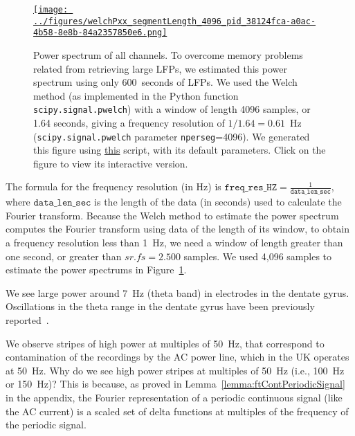 \documentclass[12pt]{article}
\begin{document}
\begin{figure}[H]
    \begin{center}
        \href{https://www.gatsby.ucl.ac.uk/~rapela/neuroinformatics/2023/ws3/figures/welchPxx_segmentLength_4096_pid_38124fca-a0ac-4b58-8e8b-84a2357850e6.html}{\texttt{[image: ../figures/welchPxx\_segmentLength\_4096\_pid\_38124fca-a0ac-4b58-8e8b-84a2357850e6.png]}}

        \caption{Power spectrum of all channels. To overcome memory
        problems related from retrieving large LFPs, we estimated this power
        spectrum using only 600~seconds of LFPs. We used the Welch method (as
        implemented in the Python function \texttt{scipy.signal.pwelch}) with a
        window of length 4096 samples, or 1.64 seconds, giving a frequency
        resolution of $1/1.64=0.61$~Hz (\texttt{scipy.signal.pwelch} parameter
        \texttt{nperseg}=4096). We generated this figure using
        \href{https://github.com/joacorapela/neuroinformatics23/blob/master/worksheets/ws3/mySolution/code/scripts/doPlotWelchPxxAllChannels.py}{this}
        script, with its default parameters.
        Click on the figure to view its interactive version.  }

                \label{fig:pxxAllChannels}

            \end{center}
        \end{figure}

The formula for the frequency resolution (in Hz) is
$\mathtt{freq\_res\_HZ}=\frac{1}{\mathtt{data\_len\_sec}}$, where
$\mathtt{data\_len\_sec}$ is the length of the data (in seconds) used to
calculate the Fourier transform. Because the Welch method to estimate the power
spectrum computes the Fourier transform using data of the length of its window,
to obtain a frequency resolution less than 1~Hz, we need a window of length
greater than one second, or greater than $sr.fs=2.500$ samples. We used 4,096
samples to estimate the power spectrums in Figure~\ref{fig:pxxAllChannels}.

We see large power around 7~Hz (theta band) in electrodes in the dentate gyrus.
Oscillations in the theta range in the dentate gyrus have been previously
reported~\citep[e.g.,][]{rangelEtAl15}.

We observe stripes of high power at multiples of 50~Hz, that correspond to
contamination of the recordings by the AC power line, which in the UK operates
at 50~Hz. Why do we see high power stripes at multiples of 50~Hz (i.e., 100~Hz
or 150~Hz)? This is because, as proved in
Lemma~\ref{lemma:ftContPeriodicSignal} in the appendix, the Fourier
representation of a periodic continuous signal (like the AC current) is a
scaled set of delta functions at multiples of the frequency of the periodic
signal.
\end{document}
